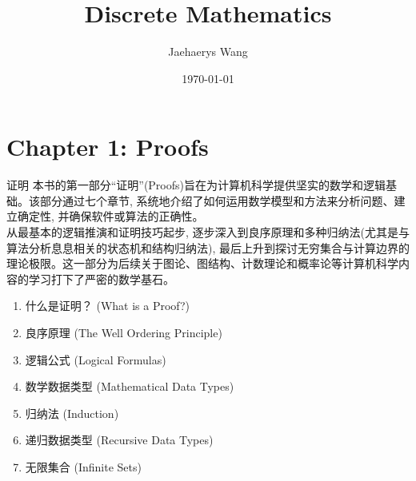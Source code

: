 \documentclass[12pt, a4paper, UTF8]{ctexart}
\title{Discrete Mathematics}
\author{Jaehaerys Wang}
\date{\today}
\begin{document}
\begin{sloppypar}

    \maketitle
    \newpage

    \tableofcontents
    \newpage

    \section{Chapter 1: Proofs}
    \begin{chaptersummary}{证明}
        本书的第一部分“证明”(Proofs)旨在为计算机科学提供坚实的数学和逻辑基础。该部分通过七个章节, 系统地介绍了如何运用数学模型和方法来分析问题、建立确定性, 并确保软件或算法的正确性。\\
        从最基本的逻辑推演和证明技巧起步, 逐步深入到良序原理和多种归纳法(尤其是与算法分析息息相关的状态机和结构归纳法), 最后上升到探讨无穷集合与计算边界的理论极限。这一部分为后续关于图论、图结构、计数理论和概率论等计算机科学内容的学习打下了严密的数学基石。
        \tcbline %
        \begin{enumerate}[nosep]
            \item 什么是证明？ (What is a Proof?)
            \item 良序原理 (The Well Ordering Principle)
            \item 逻辑公式 (Logical Formulas)
            \item 数学数据类型 (Mathematical Data Types)
            \item 归纳法 (Induction)
            \item 递归数据类型 (Recursive Data Types)
            \item 无限集合 (Infinite Sets)
        \end{enumerate}
    \end{chaptersummary}


\end{sloppypar}
\end{document}
